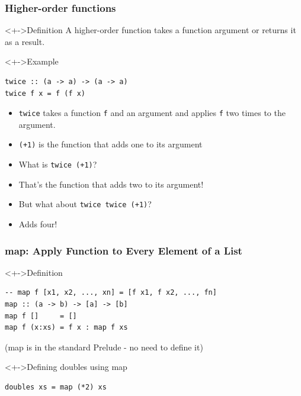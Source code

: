 \documentclass{beamer}
\begin{document}
\begin{frame}[fragile]
    \frametitle{Higher-order functions}
    \begin{alertblock}<+->{Definition}
      A \alert{higher-order function} takes a function argument
      or returns it as a result.
    \end{alertblock}
    \begin{exampleblock}<+->{Example}
\begin{lstlisting}
twice :: (a -> a) -> (a -> a)
twice f x = f (f x)
\end{lstlisting}
      \begin{itemize}
      \item \lstinline{twice} takes a function \lstinline{f} and an
        argument and applies \lstinline{f} two times to the argument.
      \item \lstinline{(+1)} is the function that adds one to its
        argument
      \item What is \lstinline{twice (+1)}?
      \item<+-> That's the function that adds two to
        its argument!
      \item<+-> But what about \lstinline{twice twice (+1)}?
      \item<+-> Adds four!
      \end{itemize}
    \end{exampleblock}
  \end{frame}
\begin{frame}[fragile]
  \frametitle{map: Apply Function to Every Element of a List}
  \begin{block}<+->{Definition}
\begin{lstlisting}
-- map f [x1, x2, ..., xn] = [f x1, f x2, ..., fn]
map :: (a -> b) -> [a] -> [b]
map f []     = []
map f (x:xs) = f x : map f xs
\end{lstlisting}
    (map is in the standard Prelude - no need to define it)
  \end{block}
  \begin{exampleblock}<+->{Defining doubles using map}
\begin{lstlisting}
doubles xs = map (*2) xs
\end{lstlisting}
  \end{exampleblock}
\end{frame}
\end{document}
